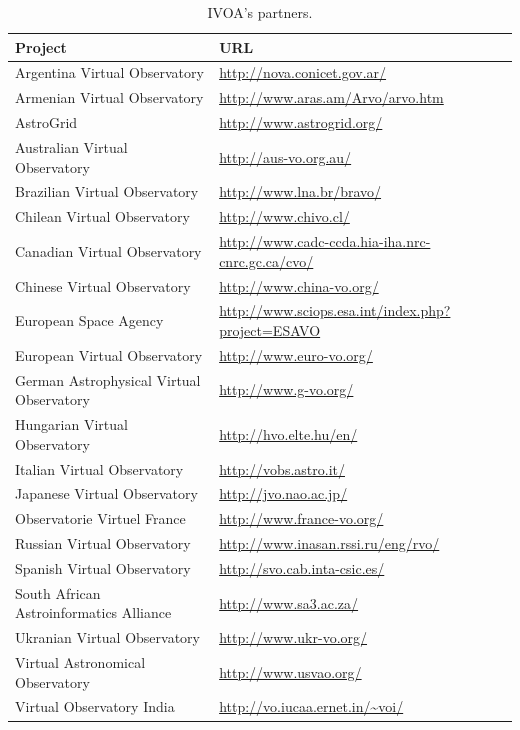 \begin{table}%
\centering
\begin{tabular}{|p{7cm}|p{7cm}|}
	\hline
	\textbf{Project} & \textbf{URL} \\
	\hline
	Argentina Virtual Observatory & \url{http://nova.conicet.gov.ar/} \\
	\hline
	Armenian Virtual Observatory & \url{http://www.aras.am/Arvo/arvo.htm} \\
	\hline
	AstroGrid & \url{http://www.astrogrid.org/} \\
	\hline
	Australian Virtual Observatory & \url{http://aus-vo.org.au/} \\
	\hline
	Brazilian Virtual Observatory & \url{http://www.lna.br/bravo/} \\
	\hline
	Chilean Virtual Observatory & \url{http://www.chivo.cl/} \\
	\hline 
	Canadian Virtual Observatory &
    \url{http://www.cadc-ccda.hia-iha.nrc-cnrc.gc.ca/cvo/} \\
	\hline
    Chinese Virtual Observatory &
    \url{http://www.china-vo.org/} \\
	\hline
    European Space Agency &
    \url{http://www.sciops.esa.int/index.php?project=ESAVO} \\
	\hline
	European Virtual Observatory & \url{http://www.euro-vo.org/} \\
	\hline
	German Astrophysical Virtual Observatory & \url{http://www.g-vo.org/} \\
	\hline
	Hungarian Virtual Observatory & \url{http://hvo.elte.hu/en/} \\
	\hline
	Italian Virtual Observatory & \url{http://vobs.astro.it/} \\
	\hline
	Japanese Virtual Observatory & \url{http://jvo.nao.ac.jp/}\\
	\hline
	Observatorie Virtuel France & \url{http://www.france-vo.org/} \\
	\hline
	Russian Virtual Observatory & \url{http://www.inasan.rssi.ru/eng/rvo/} \\
	\hline
	Spanish Virtual Observatory & \url{http://svo.cab.inta-csic.es/} \\
	\hline
	South African Astroinformatics Alliance & \url{http://www.sa3.ac.za/} \\
	\hline
	Ukranian Virtual Observatory & \url{http://www.ukr-vo.org/} \\
	\hline
	Virtual Astronomical Observatory & \url{http://www.usvao.org/} \\
	\hline
	Virtual Observatory India & \url{http://vo.iucaa.ernet.in/~voi/} \\
	\hline
\end{tabular}
\caption{IVOA's partners.}
\label{table:partners}
\end{table}

